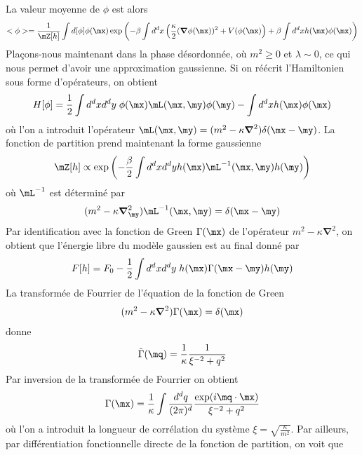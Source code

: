 La valeur moyenne de $\phi$ est alors
\begin{align}
    <\phi> =  \frac{1}{\mZ[h]} \int d [\phi] \phi(\mx)\exp \left( - \beta \int d^d x \left( \frac{\kappa}{2} ({\boldsymbol \nabla} \phi(\mx))^2 + V(\phi(\mx) \right) + \beta \int d^d x h(\mx) \phi(\mx) \right)
\end{align}
Plaçons-nous maintenant dans la phase désordonnée, où $m^2 \ge 0$ et $\lambda \sim 0$, ce qui nous permet d'avoir une approximation gaussienne. Si on réécrit l'Hamiltonien sous forme d'opérateurs, on obtient 
\begin{align}
    H[\phi] = \frac{1}{2} \int d^d x d^d y \; \phi(\mx) \mL(\mx,\my) \phi(\my) - \int d^d x h(\mx) \phi(\mx)
\end{align}
où l'on a introduit l'opérateur $\mL(\mx,\my) = (m^2 - \kappa {\boldsymbol \nabla}^2) \delta(\mx-\my)$.
La fonction de partition prend maintenant la forme gaussienne
\begin{align}
    \mZ[h] \propto \exp \left(- \frac{\beta}{2} \int d^d x d^d y h(\mx) \mL^{-1}(\mx,\my) h(\my) \right)
\end{align}
où $\mL^{-1}$ est déterminé par 
\begin{align}
    (m^2 - \kappa {\boldsymbol \nabla}_\my^2) \mL^{-1}(\mx,\my) = \delta(\mx-\my)
\end{align}
Par identification avec la fonction de Green $\Gamma(\mx)$ de l'opérateur $m^2 - \kappa {\boldsymbol \nabla}^2$, on obtient que l'énergie libre du modèle gaussien est au final donné par 
\begin{align}
    F[h] = F_0 - \frac{1}{2} \int d^d x d^dy \;  h(\mx) \Gamma(\mx-\my) h(\my)
\end{align}
La transformée de Fourrier de l'équation de la fonction de Green
\begin{align}
    (m^2-\kappa {\boldsymbol \nabla}^2) \Gamma(\mx) = \delta(\mx)
\end{align}
donne
\begin{align}
    \tilde{\Gamma}(\mq) = \frac{1}{\kappa} \frac{1}{\xi^{-2} +  q^2}
\end{align}
Par inversion de la transformée de Fourrier on obtient 
\begin{align}
    \Gamma(\mx) = \frac{1}{\kappa} \int \frac{d^dq}{(2\pi)^d} \frac{\exp(i \mq \cdot \mx)}{\xi^{-2} +  q^2}
    \label{fonction-correl}
\end{align}
où l'on a introduit la longueur de corrélation du système $\xi = \sqrt{\frac{\kappa}{m^2}}$.
Par ailleurs, par différentiation fonctionnelle directe de la fonction de partition, on voit que
